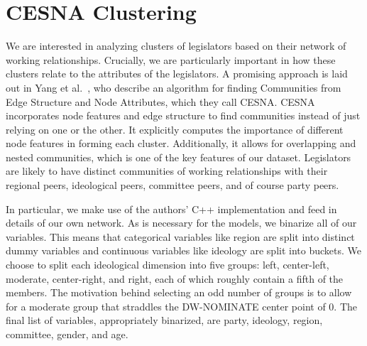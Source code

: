 \section{CESNA Clustering}

We are interested in analyzing clusters of legislators based on their network of working relationships. Crucially, we are particularly important in how these clusters relate to the attributes of the legislators. A promising approach is laid out in Yang et al.~\cite{Yang}, who describe an algorithm for finding Communities from Edge Structure and Node Attributes, which they call CESNA. CESNA incorporates node features and edge structure to find communities instead of just relying on one or the other. It explicitly computes the importance of different node features in forming each cluster. Additionally, it allows for overlapping and nested communities, which is one of the key features of our dataset. Legislators are likely to have distinct communities of working relationships with their regional peers, ideological peers, committee peers, and of course party peers. 

In particular, we make use of the authors' C++ implementation and feed in details of our own network. As is necessary for the models, we binarize all of our variables. This means that categorical variables like region are split into distinct dummy variables and continuous variables like ideology are split into buckets. We choose to split each ideological dimension into five groups: left, center-left, moderate, center-right, and right, each of which roughly contain a fifth of the members. The motivation behind selecting an odd number of groups is to allow for a moderate group that straddles the DW-NOMINATE center point of 0. The final list of variables, appropriately binarized, are party, ideology, region, committee, gender, and age.